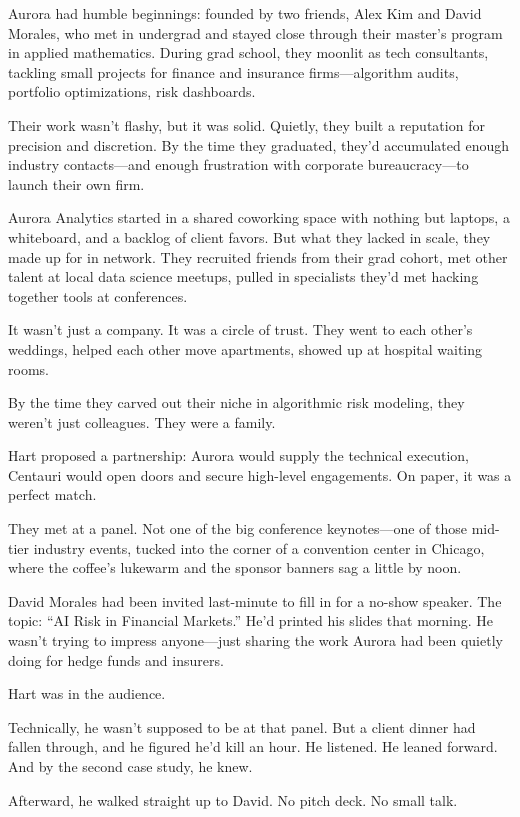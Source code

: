 \medskip

Aurora had humble beginnings: founded by two friends, Alex Kim and David Morales, who met in undergrad and stayed close through their master’s program in applied mathematics. During grad school, they moonlit as tech consultants, tackling small projects for finance and insurance firms—algorithm audits, portfolio optimizations, risk dashboards.  

Their work wasn’t flashy, but it was solid. Quietly, they built a reputation for precision and discretion. By the time they graduated, they’d accumulated enough industry contacts—and enough frustration with corporate bureaucracy—to launch their own firm.

Aurora Analytics started in a shared coworking space with nothing but laptops, a whiteboard, and a backlog of client favors. But what they lacked in scale, they made up for in network. They recruited friends from their grad cohort, met other talent at local data science meetups, pulled in specialists they’d met hacking together tools at conferences.

It wasn’t just a company. It was a circle of trust. They went to each other’s weddings, helped each other move apartments, showed up at hospital waiting rooms.  

By the time they carved out their niche in algorithmic risk modeling, they weren’t just colleagues. They were a family.

Hart proposed a partnership: Aurora would supply the technical execution, Centauri would open doors and secure high-level engagements. On paper, it was a perfect match.

They met at a panel. Not one of the big conference keynotes—one of those mid-tier industry events, tucked into the corner of a convention center in Chicago, where the coffee’s lukewarm and the sponsor banners sag a little by noon.

David Morales had been invited last-minute to fill in for a no-show speaker. The topic: “AI Risk in Financial Markets.” He’d printed his slides that morning. He wasn’t trying to impress anyone—just sharing the work Aurora had been quietly doing for hedge funds and insurers.

Hart was in the audience.

Technically, he wasn’t supposed to be at that panel. But a client dinner had fallen through, and he figured he’d kill an hour. He listened. He leaned forward. And by the second case study, he knew.

Afterward, he walked straight up to David. No pitch deck. No small talk.

